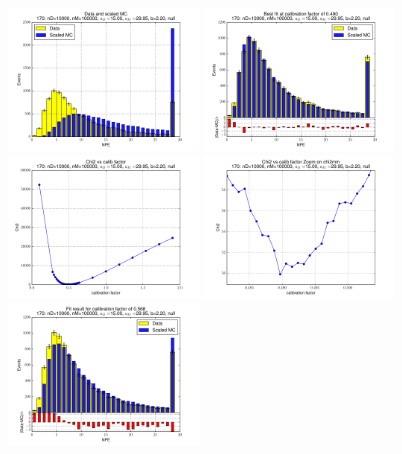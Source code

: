 
 \begin{figure}[htbp] \begin{center} 
\includegraphics[width=0.45\textwidth]{../FIGURES/170/FIG_Data_and_scaled_MC.pdf} 
\includegraphics[width=0.45\textwidth]{../FIGURES/170/FIG_Best_fit_at_calibration_factor_of_0_490.pdf} 
\includegraphics[width=0.45\textwidth]{../FIGURES/170/FIG_Chi2_vs_calib_factor.pdf} 
\includegraphics[width=0.45\textwidth]{../FIGURES/170/FIG_Chi2_vs_calib_factor_Zoom_on_chi2min.pdf} 
\includegraphics[width=0.45\textwidth]{../FIGURES/170/FIG_Fit_result_for_calibration_factor_of_0_568.pdf} 

\end{center}
\end{figure}
